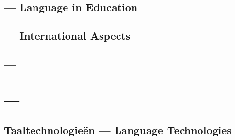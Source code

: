 \documentclass{scrartcl}
\begin{document}
\begin{Parallel}[c]{70mm}{70mm}
  \MyParallelLText{


    }

  \MyParallelRText{
   
  }

  \ParallelPar


  \subsection{ --- Language in Education}

  \MyParallelLText{


  }

  \MyParallelRText{

  }

  \ParallelPar


  \subsection{--- International Aspects}

  \MyParallelLText{

  }

  \MyParallelRText{


  }

  \ParallelPar


  \subsection{ --- }

  \MyParallelLText{

  }

  \MyParallelRText{
  
  }

  \ParallelPar


  \section{  --- }
  \subsection{Taaltechnologie{\"e}n --- Language Technologies}

  \MyParallelLText{


      }


\end{Parallel}
\end{document}
